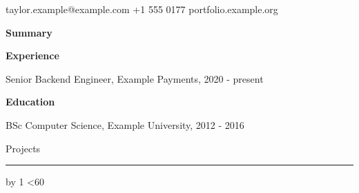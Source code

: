 \documentclass[10pt]{article}
\begin{document}
{\LARGE \Person}\par taylor.example@example.com \quad +1 555 0177 \quad portfolio.example.org\par\bigskip
\textbf{Summary}\par \Summary\par\medskip
\textbf{Experience}\par Senior Backend Engineer, Example Payments, 2020 - present\par
\JobA\par \JobB\par \JobC\par\medskip
\textbf{Education}\par BSc Computer Science, Example University, 2012 - 2016\par
\newpage
Projects\par\medskip
{}
\loop\rule{30pt}{9pt}\hspace{4pt}\advance\shapes by 1 \ifnum\shapes<60\repeat
\end{document}
